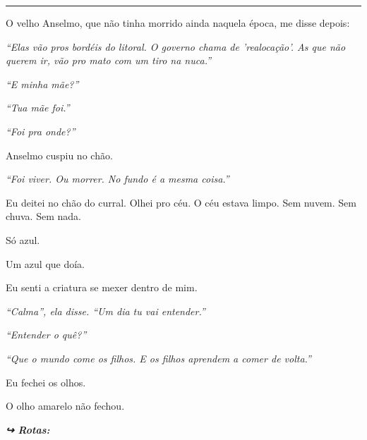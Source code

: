 \vspace{0.5em}\noindent\rule{\textwidth}{0.5pt}\vspace{0.5em}

\noindent O velho Anselmo, que não tinha morrido ainda naquela época, me disse depois:

\noindent \textit{\textquotedblleft{}Elas vão pros bordéis do litoral. O governo chama de 'realocação'. As que não querem ir, vão pro mato com um tiro na nuca.\textquotedblright{}}

\noindent \textit{\textquotedblleft{}E minha mãe?\textquotedblright{}}

\noindent \textit{\textquotedblleft{}Tua mãe foi.\textquotedblright{}}

\noindent \textit{\textquotedblleft{}Foi pra onde?\textquotedblright{}}

\noindent Anselmo cuspiu no chão.

\noindent \textit{\textquotedblleft{}Foi viver. Ou morrer. No fundo é a mesma coisa.\textquotedblright{}}

\noindent Eu deitei no chão do curral. Olhei pro céu. O céu estava limpo. Sem nuvem. Sem chuva. Sem nada.

\noindent Só azul.

\noindent Um azul que doía.

\noindent Eu senti a criatura se mexer dentro de mim.

\noindent \textit{\textquotedblleft{}Calma\textquotedblright{}\textit{, ela disse. }\textquotedblleft{}Um dia tu vai entender.\textquotedblright{}}

\noindent \textit{\textquotedblleft{}Entender o quê?\textquotedblright{}}

\noindent \textit{\textquotedblleft{}Que o mundo come os filhos. E os filhos aprendem a comer de volta.\textquotedblright{}}

\noindent Eu fechei os olhos.

\noindent O olho amarelo não fechou.

\vspace{0.5em}
\noindent\textit{\textbf{↪ Rotas:}  \rotasep {} \rotasep {} \rotasep {}}